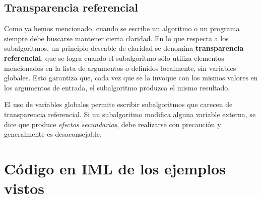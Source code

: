 \documentclass[]{book}
\begin{document}
\subsection{Transparencia referencial}\label{transparencia-referencial}

Como ya hemos mencionado, cuando se escribe un algoritmo o un programa
siempre debe buscarse mantener cierta claridad. En lo que respecta a los
subalgoritmos, un principio deseable de claridad se denomina
\textbf{transparencia referencial}, que se logra cuando el subalgoritmo
sólo utiliza elementos mencionados en la lista de argumentos o definidos
localmente, sin variables globales. Esto garantiza que, cada vez que se
la invoque con los mismos valores en los argumentos de entrada, el
subalgoritmo produzca el mismo resultado.

El uso de variables globales permite escribir subalgoritmos que carecen
de transparencia referencial. Si un subalgoritmo modifica alguna
variable externa, se dice que produce \emph{efectos secundarios}, debe
realizarse con precaución y generalmente es desaconsejable.

\section{Código en IML de los ejemplos
vistos}\label{codigo-en-iml-de-los-ejemplos-vistos}
\end{document}
